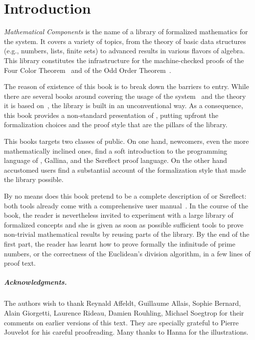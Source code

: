 \setcounter{chapter}{-1}
\chapter{Introduction}

\emph{Mathematical Components}
is the name of a library of formalized mathematics for the
\Coq{} system.  It covers a variety of
topics, from the theory of basic data structures (e.g., numbers, lists, finite
sets) to advanced results in various flavors of algebra. This library
constitutes the infrastructure for the machine-checked proofs of the
Four Color Theorem~\cite{Gonthier08} and of the
Odd Order Theorem~\cite{gonthier:hal-00816699}.

The reason of existence of this book is to break down the barriers to entry.
While there are several books around covering the usage of the
\Coq{} system~\cite{BC04,SF,CPDT}
and the theory it is based
on~\cite[chapter 4]{Coq:manual}\cite{paulinmohring:hal-01094195,hottbook},
the \mcbMC{} library is built
in an unconventional way.  As a consequence, this book provides a
non-standard presentation of \Coq{}, putting upfront the formalization
choices and the proof style that are the pillars of the library.

This books targets two classes of public.  On one hand, newcomers,
even the more mathematically inclined ones, %
find a soft
introduction to the programming
language of \Coq{}, Gallina, and the Ssreflect proof language.
On the other hand accustomed \Coq{} users %
find a
substantial account of the formalization style that made the \mcbMC{}
library possible.


By no means does this book pretend to be a complete description of \Coq{} or
Ssreflect: both tools already come with a comprehensive user
manual~\cite{Coq:manual,ssrman}.
In the course of the book, the reader is nevertheless invited to
experiment with  a large library of formalized concepts and she is
given as soon as possible sufficient tools to prove non-trivial
mathematical results by reusing parts of the library. By the end of
the first part, the reader has learnt how to prove formally the
infinitude of prime numbers, or the correctness of the Euclidean's
division algorithm, in a few lines of proof text.

\paragraph{Acknowledgments.} The authors wish to thank
Reynald Affeldt, Guillaume Allais, Sophie Ber\-nard, Alain Giorgetti,
Laurence Rideau, Damien Rouhling, Michael Soegtrop for their comments
on earlier versions of this text. They are
specially grateful to Pierre Jouvelot for his careful
proofreading. Many thanks to Hanna for the illustrations.
